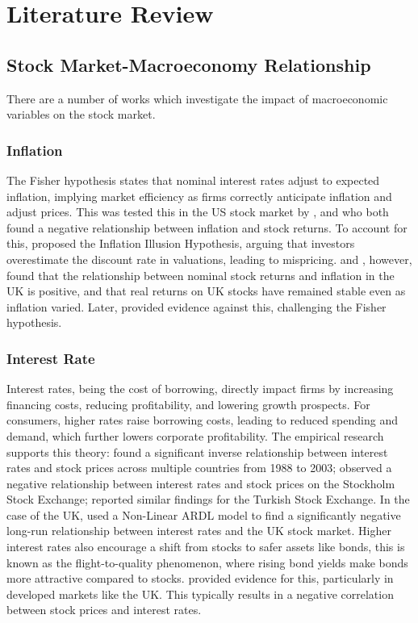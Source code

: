 \documentclass[11pt,a4paper]{article}
\newcommand{\citeboth}[1]{\citeauthor{#1} \citep{#1}}
\begin{document}
\section{Literature Review}

\subsection{Stock Market-Macroeconomy Relationship}

There are a number of works which investigate the impact of macroeconomic variables
on the stock market.

\subsubsection{Inflation}

The Fisher hypothesis states that nominal interest rates adjust to expected 
inflation, implying market efficiency as firms correctly anticipate inflation 
and adjust prices. This was tested this in the US stock market by \citeboth{jaffe1976}, and
\citeboth{bodie1976} who both found a negative relationship between inflation and stock returns.
To account for this,
\citeboth{mogdiliani1979} proposed the Inflation Illusion Hypothesis, 
arguing that investors overestimate the discount rate in valuations, leading to mispricing. 
\citeboth{gultekin1983} and \citeboth{firth1979}, however, found that the relationship between nominal stock returns and inflation in the UK is positive, and that real returns on UK stocks have remained stable even as inflation varied.
Later, \citeboth{hasan2008} provided evidence against this, challenging the Fisher hypothesis.

\subsubsection{Interest Rate}

Interest rates, being the cost of borrowing, directly impact firms by increasing financing costs, reducing profitability, and lowering growth prospects. For consumers, higher rates raise borrowing costs, leading to reduced spending and demand, which further lowers corporate profitability. 
The empirical research supports this theory: \citeboth{alam2009} found a significant inverse relationship between interest rates and stock prices across multiple countries from 1988 to 2003; 
\citeboth{talla2013} observed a negative relationship between interest rates and stock prices on the Stockholm Stock Exchange; 
\citeboth{demir2019} reported similar findings for the Turkish Stock Exchange. In the case of the UK, \citeboth{neifar2023} used a Non-Linear ARDL model to find a significantly negative long-run relationship between interest rates and the UK stock market. Higher interest rates also encourage a shift from stocks to safer 
assets like bonds, this is known as the flight-to-quality phenomenon, where rising bond yields make bonds more attractive compared to stocks. \citeboth{asgharian2016} provided evidence for this, particularly in developed markets like the UK. This typically results in a negative correlation between stock prices and interest rates.
\end{document}
